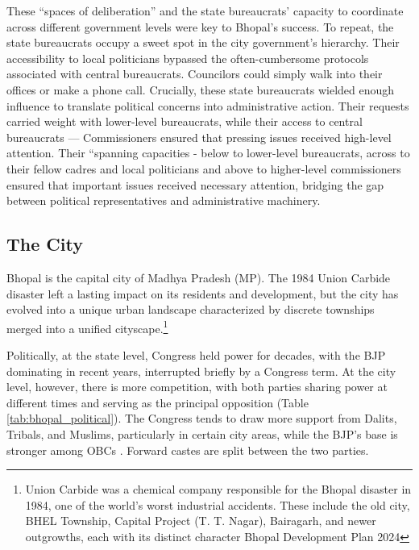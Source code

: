 These ``spaces of deliberation'' and the state bureaucrats' capacity to coordinate across different government levels were key to Bhopal's success. To repeat, the state bureaucrats occupy a sweet spot in the city government's hierarchy. Their accessibility to local politicians bypassed the often-cumbersome protocols associated with central bureaucrats. Councilors could simply walk into their offices or make a phone call. Crucially, these state bureaucrats wielded enough influence to translate political concerns into administrative action. Their requests carried weight with lower-level bureaucrats, while their access to central bureaucrats — Commissioners ensured that pressing issues received high-level attention. Their ``spanning capacities - below to lower-level bureaucrats, across to their fellow cadres and local politicians and above to higher-level commissioners ensured that important issues received necessary attention, bridging the gap between political representatives and administrative machinery.

\subsection{The City}

Bhopal is the capital city of Madhya Pradesh (MP). The 1984 Union Carbide disaster left a lasting impact on its residents and development, but the city has evolved into a unique urban landscape characterized by discrete townships merged into a unified cityscape.\footnote{Union Carbide was a chemical company responsible for the Bhopal disaster in 1984, one of the world's worst industrial accidents. These include the old city, BHEL Township, Capital Project (T. T. Nagar), Bairagarh, and newer outgrowths, each with its distinct character Bhopal Development Plan 2024}

Politically, at the state level, Congress held power for decades, with the BJP dominating in recent years, interrupted briefly by a Congress term. At the city level, however, there is more competition, with both parties sharing power at different times and serving as the principal opposition (Table \ref{tab:bhopal_political}). The Congress tends to draw more support from Dalits, Tribals, and Muslims, particularly in certain city areas, while the BJP's base is stronger among OBCs \citep{Auerbach2020}. Forward castes are split between the two parties.

